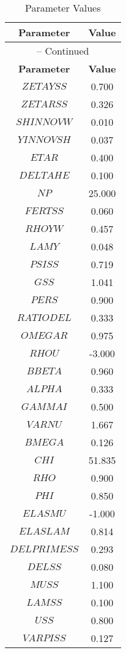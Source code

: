 \begin{center}
\begin{longtable}{cc}
\caption{Parameter Values}\\%
\toprule%
\multicolumn{1}{c}{\textbf{Parameter}} &
\multicolumn{1}{c}{\textbf{Value}}  \\%
\midrule%
\endfirsthead
\multicolumn{2}{c}{{\tablename} \thetable{} -- Continued}\\%
\midrule%
\multicolumn{1}{c}{\textbf{Parameter}} &
\multicolumn{1}{c}{\textbf{Value}} \\%
\midrule%
\endhead
$ZETAYSS$ 	 & 	 0.700 \\
$ZETARSS$ 	 & 	 0.326 \\
$SHINNOVW$ 	 & 	 0.010 \\
$YINNOVSH$ 	 & 	 0.037 \\
$ETAR$ 	 & 	 0.400 \\
$DELTAHE$ 	 & 	 0.100 \\
$NP$ 	 & 	 25.000 \\
$FERTSS$ 	 & 	 0.060 \\
$RHOYW$ 	 & 	 0.457 \\
$LAMY$ 	 & 	 0.048 \\
$PSISS$ 	 & 	 0.719 \\
$GSS$ 	 & 	 1.041 \\
$PERS$ 	 & 	 0.900 \\
$RATIODEL$ 	 & 	 0.333 \\
$OMEGAR$ 	 & 	 0.975 \\
$RHOU$ 	 & 	 -3.000 \\
$BBETA$ 	 & 	 0.960 \\
$ALPHA$ 	 & 	 0.333 \\
$GAMMAI$ 	 & 	 0.500 \\
$VARNU$ 	 & 	 1.667 \\
$BMEGA$ 	 & 	 0.126 \\
$CHI$ 	 & 	 51.835 \\
$RHO$ 	 & 	 0.900 \\
$PHI$ 	 & 	 0.850 \\
$ELASMU$ 	 & 	 -1.000 \\
$ELASLAM$ 	 & 	 0.814 \\
$DELPRIMESS$ 	 & 	 0.293 \\
$DELSS$ 	 & 	 0.080 \\
$MUSS$ 	 & 	 1.100 \\
$LAMSS$ 	 & 	 0.100 \\
$USS$ 	 & 	 0.800 \\
$VARPISS$ 	 & 	 0.127 \\

\end{longtable}
\end{center}
